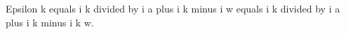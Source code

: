 Epsilon k equals i k divided by i a plus i k minus i w equals i k divided by i a plus i k minus i k w.